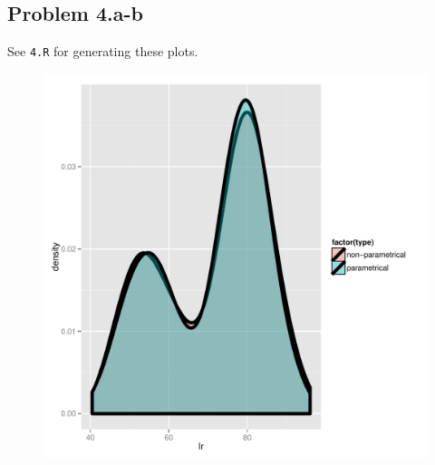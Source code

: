 \documentclass[letter]{article}
\begin{document}
\subsection*{Problem 4.a-b}

See \texttt{4.R} for generating these plots. 
\begin{figure}[h]
 \includegraphics[scale=0.5]{plot4b.pdf}
\end{figure}
\pagebreak
\end{document}
